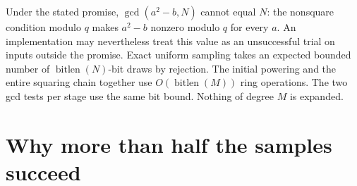 Under the stated promise, $\gcd(a^2-b,N)$ cannot equal $N$: the
nonsquare condition modulo $q$ makes $a^2-b$ nonzero modulo $q$ for
every $a$.  An implementation may nevertheless treat this value as an
unsuccessful trial on inputs outside the promise.
Exact uniform sampling takes an expected bounded number of
$\operatorname{bitlen}(N)$-bit draws by rejection.
The initial powering and the entire squaring chain together use
$O(\operatorname{bitlen}(M))$ ring operations.  The two gcd tests per
stage use the same bit bound.  Nothing of degree $M$ is expanded.

\section{Why more than half the samples succeed}
\label{sec:qr-success}

